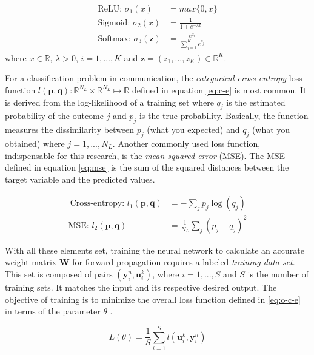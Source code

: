 \documentclass[conference]{IEEEtran}
\begin{document}
\begin{align}
	\text{ReLU: } \sigma_1 (x)& = max\{0, x\} \label{eq:relu}\\ 
	\text{Sigmoid: } \sigma_2 (x)& = \frac{1}{1+e^{- \lambda x}} \label{eq:sig}\\
	\text{Softmax: } \sigma_3 (\textbf{z})& = \frac{e^{z_i}}{\sum_{j=1}^{K}e^{z_j}}\label{eq:soft}
\end{align}
where $x \in \mathbb{R}$, $\lambda>0$, $i = 1,...,K$ and $\textbf{z} = (z_1,...,z_K) \in \mathbb{R}^K$.

For a classification problem in communication, the \textit{categorical cross-entropy} loss function $l(\textbf{p},\textbf{q}):\mathbb{R} ^{N_L}\times \mathbb{R} ^{N_L}\mapsto \mathbb{R}$ defined in equation \eqref{eq:c-e} is most common. It is derived from the log-likelihood of a training set where $q_j$ is the estimated probability of the outcome $j$ and $p_{j}$ is the true probability. Basically, the function measures the dissimilarity between $p_{j}$ (what you expected) and $q_{j}$ (what you obtained) \cite{murphy2013machine} where $j=1,...,N_L$. Another commonly used loss function, indispensable for this research, is the \textit{mean squared error} (MSE). The MSE defined in equation \eqref{eq:mse} is the sum of the squared distances between the target variable and the predicted values. 

\begin{align}
\
	\text{Cross-entropy: }l_1(\textbf{p},\textbf{q}) &=-\sum _{j}p_{j}\log \left( q_{j}\right)\label{eq:c-e} \\
	\text{MSE: } l_2(\textbf{p},\textbf{q}) &=\frac{1}{N_L}\sum _{j}(p_{j}-q_{j})^{2} \label{eq:mse}
\end{align}

With all these elements set, training the neural network to calculate an accurate weight matrix $\textbf{W}$ for forward propagation requires a labeled \textit{training data set}. This set is composed of pairs $ (\textbf{y}_{i}^{n}, {\mathbf{u}}_i^k) $, where $i=1,...,S$ and $S$ is the number of training sets. It matches the input and its respective desired output. The objective of training is to minimize the overall loss function defined in \eqref{eq:o-c-e} in terms of the parameter $\theta$ \cite{DBLP:journals/corr/OSheaH17}. 

\begin{equation}\label{eq:o-c-e}
L\left( \theta \right) =\dfrac {1}{S}\sum ^{S}_{i=1}l\left({\mathbf{u}}_i^k  , \textbf{y}_{i}^{n}\right)	
\end{equation}  
\end{document}
